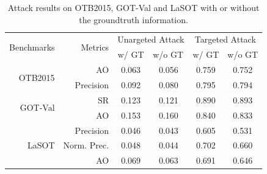 \documentclass[journal]{IEEEtran}
\begin{document}
\begin{table}[t]
  \centering
  \caption{Attack results on OTB2015, GOT-Val and LaSOT with or without the groundtruth information.}
  \begin{tabular}{rrcccc}
  \toprule
  \multirow{2}{*}[-2pt]{Benchmarks} & \multirow{2}{*}[-2pt]{Metrics} & \multicolumn{2}{c}{Unargeted Attack} & \multicolumn{2}{c}{Targeted Attack} \\ \cmidrule{3-6}
                              &                          & w/ GT  & \multicolumn{1}{l}{w/o GT}  & w/ GT  & \multicolumn{1}{l}{w/o GT} \\ \midrule
  \multirow{2}{*}{OTB2015}     & AO                       & 0.063  & 0.056                       & 0.759  & 0.752                      \\
                              & Precision                & 0.092  & 0.080                       & 0.795  & 0.794                      \\ \midrule
  \multirow{2}{*}{GOT-Val}    & SR                       & 0.123  & 0.121                       & 0.890  & 0.893                      \\
                              & AO                       & 0.153  & 0.160                       & 0.840  & 0.833                      \\ \midrule
  \multirow{3}{*}{LaSOT}      & Precision                & 0.046  & 0.043                       & 0.605  & 0.531                      \\
                              & Norm. Prec.              & 0.048  & 0.044                       & 0.702  & 0.660                      \\
                              & AO                       & 0.069  & 0.063                       & 0.691  & 0.646                      \\ \bottomrule
  \end{tabular}
  \label{tab:agent_GT}
\end{table}
\end{document}
